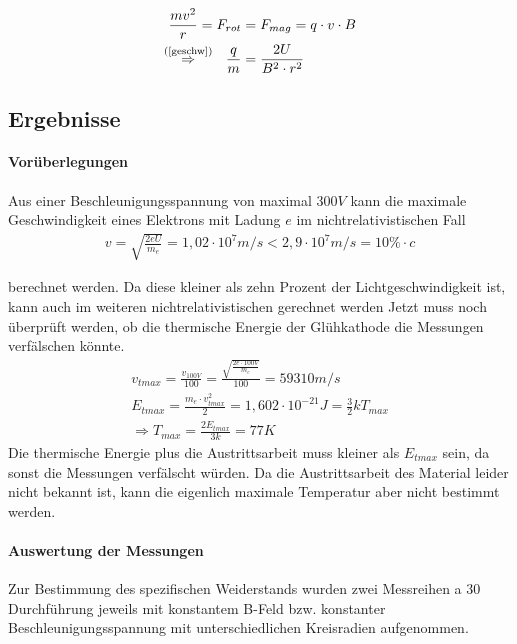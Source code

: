 \documentclass[11pt, a4paper]{article}
\begin{document}
    \begin{align}
        \frac{mv^2}{r} = F_{rot} &= F_{mag} = q \cdot v \cdot B \\
        \overset{\text{(\ref{geschw})}}{\Rightarrow} \ \  \frac{q}{m} &= \frac{2U}{B^2 \cdot r^2} \label{qm_formel}
    \end{align}

    \subsection{Ergebnisse}
    \paragraph{Vorüberlegungen}

    Aus einer Beschleunigungsspannung von maximal $300 \si{V}$ kann die maximale Geschwindigkeit eines Elektrons mit Ladung $e$ im nichtrelativistischen Fall
    \begin{align}
        v = \sqrt{\frac{2 e U}{m_e}} = 1,02 \cdot 10^{7} \si{m/s} < 2,9 \cdot 10^{7} \si{m/s} = 10\% \cdot c
    \end{align}


    berechnet werden. Da diese kleiner als zehn Prozent der Lichtgeschwindigkeit ist, kann auch im weiteren nichtrelativistischen gerechnet werden
    Jetzt muss noch überprüft werden, ob die thermische Energie der Glühkathode die Messungen verfälschen könnte.
    \begin{align}
        v_{tmax} = \frac{v_{100V}}{100} = \frac{\sqrt{\frac{2 e \cdot 100 \si{V}}{m_e}}}{100} = 59310 \si{m \per s} \\
        E_{tmax} = \frac{m_e \cdot v_{tmax}^2}{2} = 1,602 \cdot 10^{-21} \si{J} = \frac{3}{2} k T_{max} \\
        \Rightarrow T_{max} = \frac{2 E_{tmax}}{3 k} = 77K
    \end{align}
    Die thermische Energie plus die Austrittsarbeit muss kleiner als $E_{tmax}$ sein, da sonst die Messungen verfälscht würden. Da die Austrittsarbeit des Material leider nicht bekannt ist, kann die eigenlich maximale Temperatur aber nicht bestimmt werden.


    \paragraph{Auswertung der Messungen}
        Zur Bestimmung des spezifischen Weiderstands wurden zwei Messreihen a 30 Durchführung jeweils mit konstantem B-Feld bzw. konstanter Beschleunigungsspannung mit unterschiedlichen Kreisradien aufgenommen.
        
\end{document}
